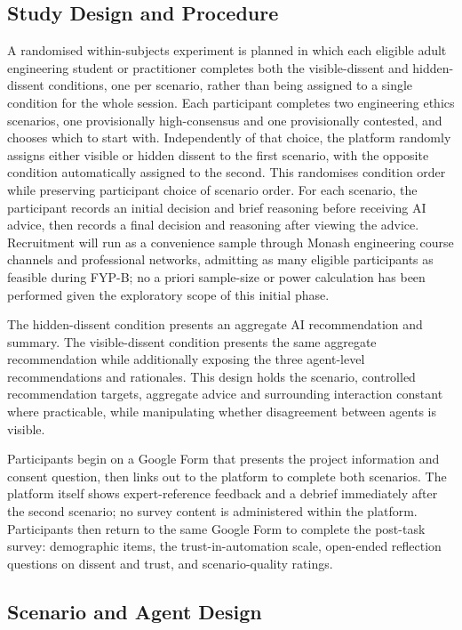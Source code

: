 \documentclass[conference]{IEEEtran}
\begin{document}
\subsection{Study Design and Procedure}

A randomised within-subjects experiment is planned in which each eligible adult engineering student or practitioner completes both the visible-dissent and hidden-dissent conditions, one per scenario, rather than being assigned to a single condition for the whole session. Each participant completes two engineering ethics scenarios, one provisionally high-consensus and one provisionally contested, and chooses which to start with. Independently of that choice, the platform randomly assigns either visible or hidden dissent to the first scenario, with the opposite condition automatically assigned to the second. This randomises condition order while preserving participant choice of scenario order. For each scenario, the participant records an initial decision and brief reasoning before receiving AI advice, then records a final decision and reasoning after viewing the advice. Recruitment will run as a convenience sample through Monash engineering course channels and professional networks, admitting as many eligible participants as feasible during FYP-B; no a priori sample-size or power calculation has been performed given the exploratory scope of this initial phase.

The hidden-dissent condition presents an aggregate AI recommendation and summary. The visible-dissent condition presents the same aggregate recommendation while additionally exposing the three agent-level recommendations and rationales. This design holds the scenario, controlled recommendation targets, aggregate advice and surrounding interaction constant where practicable, while manipulating whether disagreement between agents is visible.

Participants begin on a Google Form that presents the project information and consent question, then links out to the platform to complete both scenarios. The platform itself shows expert-reference feedback and a debrief immediately after the second scenario; no survey content is administered within the platform. Participants then return to the same Google Form to complete the post-task survey: demographic items, the trust-in-automation scale, open-ended reflection questions on dissent and trust, and scenario-quality ratings.

\subsection{Scenario and Agent Design}
\end{document}
